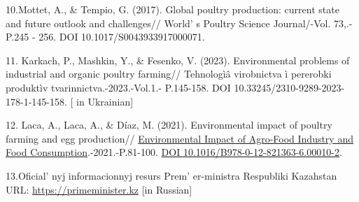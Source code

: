 \begin{references}
10.Mottet, A., \& Tempio, G. (2017). Global poultry production: current
state and future outlook and challenges// World' s
Poultry Science Journal/-Vol. 73,.-P.245 - 256.
\linebreak  DOI 10.1017/S0043933917000071.

11. Karkach, P., Mashkin, Y., \& Fesenko, V. (2023). Environmental
problems of industrial and organic poultry farming// Tehnologìâ
virobnictva ì pererobki produktìv tvarinnictva.-2023.-Vol.1.-
P.145-158. DOI 10.33245/2310-9289-2023-178-1-145-158. {[} in Ukrainian{]}

12. Laca, A., Laca, A., \& Díaz, M. (2021). Environmental impact of
poultry farming and egg
production// \href{https://www.sciencedirect.com/book/9780128213636/environmental-impact-of-agro-food-industry-and-food-consumption}{Environmental
Impact of Agro-Food Industry and Food Consumption}.-2021.-P.81-100.
\linebreak  \href{https://doi.org/10.1016/B978-0-12-821363-6.00010-2}{DOI
10.1016/B978-0-12-821363-6.00010-2}.

13.Oficial' nyj informacionnyj resurs
Prem' er-ministra Respubliki Kazahstan URL:\linebreak 
\href{https://primeminister.kz/ru/news/investitsii-v-apk-pozvolyat-za-2-goda-polnostyu-
zakryt-potrebnost-v-myase-ptitsy-i-nachat-eksport-28485/}{https://primeminister.kz} {[}in Russian{]}
\end{references}

